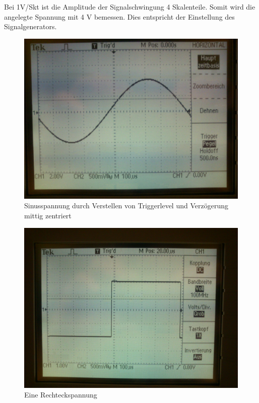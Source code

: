 Bei 1V/Skt ist die Amplitude der Signalschwingung 4 Skalenteile. Somit wird die angelegte Spannung mit 4 V bemessen. Dies entspricht der Einstellung des Signalgenerators.
\begin{figure}[H]
	\centering
	\includegraphics[width=\linewidth]{versuch3/oszi/DSC_0240.JPG}
	\caption{Sinusspannung durch Verstellen von Triggerlevel und Verzögerung mittig zentriert}
\end{figure}
\begin{figure}[H]
	\centering
	\includegraphics[width=\linewidth]{versuch3/oszi/DSC_0246.JPG}
	\caption{Eine Rechteckspannung}
\end{figure}
